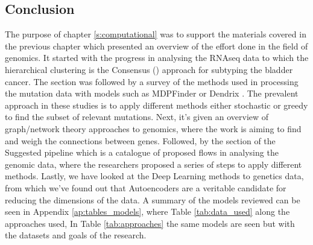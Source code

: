 





\subsection{Conclusion}

The purpose of chapter \ref{s:computational} was to support the materials covered in the previous chapter which presented an overview of the effort done in the field of genomics. It started with the progress in analysing the RNAseq data to which the hierarchical clustering is the Consensus (\citet{Kamoun2020-tj}) approach for subtyping the bladder cancer. The section was followed by a survey of the methods used in processing the mutation data with models such as MDPFinder \citet{Zhao2012-wj} or Dendrix \citet{Vandin2012-cf}. The prevalent approach in these studies is to apply different methods either stochastic or greedy to find the subset of relevant mutations. Next, it's given an overview of graph/network theory approaches to genomics, where the work is aiming to find and weigh the connections between genes. Followed, by the section of the Suggested pipeline which is a catalogue of proposed flows in analysing the genomic data, where the researchers proposed a series of steps to apply different methods. Lastly, we have looked at the Deep Learning methods to genetics data, from which we've found out that Autoencoders are a veritable candidate for reducing the dimensions of the data. A summary of the models reviewed can be seen in Appendix \ref{ap:tables_models}, where Table \ref{tab:data_used} along the approaches used, In Table \ref{tab:approaches} the same models are seen but with the datasets and goals of the research.

